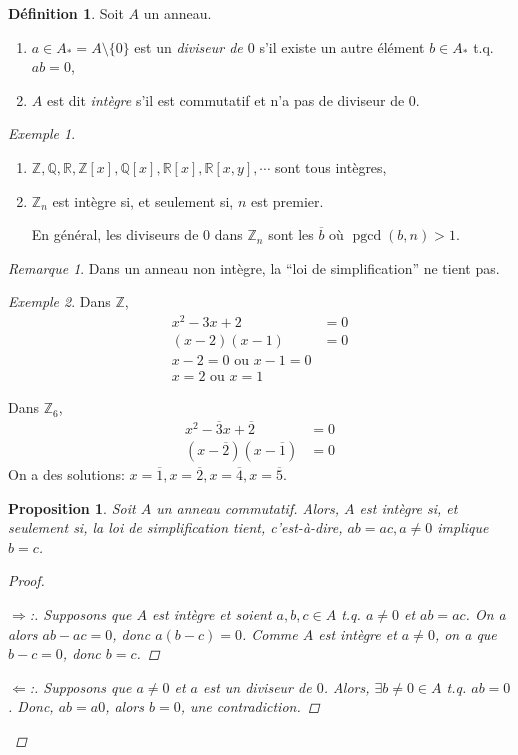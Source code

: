 \documentclass{report}
\newtheorem*{prop}{Proposition}
\theoremstyle{definition}
\newtheorem*{dfn}{D\'efinition}
\theoremstyle{remark}
\newtheorem*{exem}{Exemple}
\newtheorem*{rmq}{Remarque}
\newenvironment*{subproof}[1][D\'emonstration]
{
\begin{proof}[#1]

}
{
\renewcommand{\qedsymbol}{$\blacksquare$}
\end{proof}
\renewcommand{\qedsymbol}{$\square$}
}
\def\ZZ{\mathbb{Z}}
\def\QQ{\mathbb{Q}}
\def\RR{\mathbb{R}}
\begin{document}
	\begin{dfn}
		Soit $A$ un anneau.
		\begin{enumerate}
			\item $a \in A_* = A \setminus \{0\}$ est un \emph{diviseur de $0$} s'il existe un autre \'el\'ement $b \in A_*$ t.q. $ab=0$,
			\item $A$ est dit \emph{int\`egre} s'il est commutatif et n'a pas de diviseur de $0$.
		\end{enumerate}
	\end{dfn}

	\begin{exem}
		\begin{enumerate}
			\item $\ZZ, \QQ, \RR, \ZZ[x], \QQ[x], \RR[x], \RR[x,y], \cdots$ sont tous int\`egres,
			\item $\ZZ_n$ est int\`egre si, et seulement si, $n$ est premier.

			En g\'en\'eral, les diviseurs de $0$ dans $\ZZ_n$ sont les $\overline{b}$ o\`u $\operatorname{pgcd}(b,n)>1$.
		\end{enumerate}
	\end{exem}

	\begin{rmq}
		Dans un anneau non int\`egre, la ``loi de simplification'' ne tient pas.
	\end{rmq}

	\begin{exem}
		Dans $\ZZ$,
		\begin{align*}
			x^2-3x+2&= 0\\
			(x-2)(x-1)&= 0\\
			x-2=0 \text{ ou } x-1=0\\
			x=2 \text{ ou } x=1
		\end{align*}

		Dans $\ZZ_6$,
		\begin{align*}
			x^2-\overline3x+\overline2&= 0\\
			(x-\overline2)(x-\overline1)&= 0
		\end{align*}
		On a des solutions: $x=\overline1, x=\overline2, x=\overline4, x=\overline5$.
	\end{exem}

	\begin{prop}
		Soit $A$ un anneau commutatif. Alors, $A$ est int\`egre si, et seulement si, la loi de simplification tient, c'est-\`a-dire, $ab=ac, a\neq0$ implique $b=c$.
		\begin{proof}
			\begin{subproof}[$\Rightarrow$:]
				Supposons que $A$ est int\`egre et soient $a,b,c \in A$ t.q. $a\neq0$ et $ab=ac$. On a alors $ab-ac=0$, donc $a(b-c)=0$. Comme $A$ est int\`egre et $a\neq0$, on a que $b-c=0$, donc $b=c$.
			\end{subproof}
			\begin{subproof}[$\Leftarrow$:]
				Supposons que $a\neq0$ et $a$ est un diviseur de $0$. Alors, $\exists b\neq0 \in A$ t.q. $ab=0$. Donc, $ab=a0$, alors $b=0$, une contradiction.
			\end{subproof}
		\end{proof}
	\end{prop}
\end{document}

